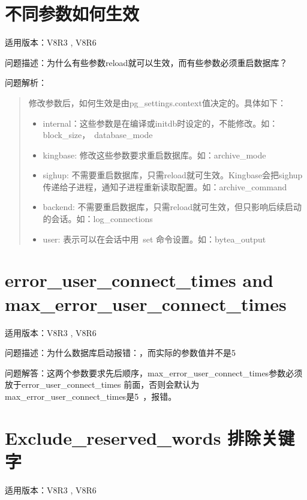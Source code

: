 \documentclass[letterpaper,10pt,english]{sphinxmanual}
\begin{document}
\section{不同参数如何生效}
\label{\detokenize{parameter:id2}}
适用版本：V8R3 , V8R6

问题描述：为什么有些参数reload就可以生效，而有些参数必须重启数据库？

问题解析：
\begin{quote}

修改参数后，如何生效是由pg\_settings.context值决定的。具体如下：
\begin{itemize}
\item {} 
internal：这些参数是在编译或initdb时设定的，不能修改。如：block\_size， database\_mode

\item {} 
kingbase: 修改这些参数要求重启数据库。如：archive\_mode

\item {} 
sighup: 不需要重启数据库，只需reload就可生效。Kingbase会把sighup传递给子进程，通知子进程重新读取配置。如：archive\_command

\item {} 
backend: 不需要重启数据库，只需reload就可生效，但只影响后续启动的会话。如：log\_connections

\item {} 
user: 表示可以在会话中用 set 命令设置。如：bytea\_output

\end{itemize}
\end{quote}


\section{error\_user\_connect\_times and max\_error\_user\_connect\_times}
\label{\detokenize{parameter:error-user-connect-times-and-max-error-user-connect-times}}
适用版本：V8R3 , V8R6

问题描述：为什么数据库启动报错：，而实际的参数值并不是5

问题解答：这两个参数要求先后顺序，max\_error\_user\_connect\_times参数必须放于error\_user\_connect\_times
前面，否则会默认为max\_error\_user\_connect\_times是5 ，报错。


\section{Exclude\_reserved\_words 排除关键字}
\label{\detokenize{parameter:exclude-reserved-words}}
适用版本：V8R3 , V8R6
\end{document}
